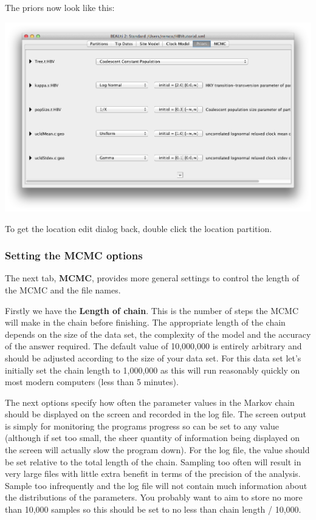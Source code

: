 \documentclass{article}
\begin{document}
The priors now look like this:

\includegraphics[scale=0.4]{figures/BEAUti_priors2.png}

To get the location edit dialog back, double click the location partition.


\subsubsection*{Setting the MCMC options }

The next tab, {\bf MCMC}, provides more general
settings to control the length of the MCMC and the file names. 

Firstly we have the \textbf{Length of chain}. This is the number of
steps the MCMC will make in the chain before finishing. The appropriate length of the chain depends on the size of the data set, the complexity of the
model and the accuracy of the answer required. The default value of 10,000,000
is entirely arbitrary and should be adjusted according to the size
of your data set. For this data set let's initially set the chain
length to 1,000,000 as this will run reasonably quickly on most modern
computers (less than 5 minutes).

The next options specify how often the parameter values in the Markov
chain should be displayed on the screen and recorded in the log file.
The screen output is simply for monitoring the programs progress so
can be set to any value (although if set too small, the sheer quantity
of information being displayed on the screen will actually slow the
program down). For the log file, the value should be set relative
to the total length of the chain. Sampling too often will result in
very large files with little extra benefit in terms of the precision
of the analysis. Sample too infrequently and the log file will not
contain much information about the distributions of the parameters. 
You probably want to aim to store no more than 10,000 samples so this should be
set to no less than chain length / 10,000.
\end{document}
